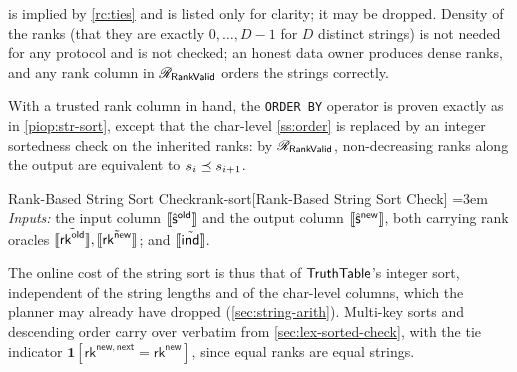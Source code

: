  is implied by \cref{rc:ties} and is listed only for clarity; it may be dropped. Density of the ranks (that they are exactly $0, \dots, D-1$ for $D$ distinct strings) is not needed for any protocol and is not checked; an honest data owner produces dense ranks, and any rank column in $\mathscr{R}_{\mathsf{RankValid}}$ orders the strings correctly.

With a trusted rank column in hand, the \texttt{ORDER BY} operator is proven exactly as in \cref{piop:str-sort}, except that the char-level \cref{ss:order} is replaced by an integer sortedness check on the inherited ranks: by $\mathscr{R}_{\mathsf{RankValid}}$, non-decreasing ranks along the output are equivalent to $s_i \preceq s_{i+1}$.

\begin{DefinePIOP}{Rank-Based String Sort Check}{rank-sort}[Rank-Based String Sort Check]
  \emergencystretch=3em\relax
  \emph{Inputs:} the input column $\llbracket\hat{\mathsf{s}}^{\mathsf{old}}\rrbracket$ and the output column $\llbracket\hat{\mathsf{s}}^{\mathsf{new}}\rrbracket$, both carrying rank oracles $\llbracket\tilde{\mathsf{rk}^{\mathsf{old}}}\rrbracket, \llbracket\tilde{\mathsf{rk}^{\mathsf{new}}}\rrbracket$; and $\llbracket\tilde{\mathsf{ind}}\rrbracket$.
  \vspace{2mm}
\end{DefinePIOP}

The online cost of the string sort is thus that of $\mathsf{TruthTable}$'s integer sort, independent of the string lengths and of the char-level columns, which the planner may already have dropped (\cref{sec:string-arith}). Multi-key sorts and descending order carry over verbatim from \cref{sec:lex-sorted-check}, with the tie indicator $\mathbf{1}[\mathsf{rk}^{\mathsf{new},\mathsf{next}} = \mathsf{rk}^{\mathsf{new}}]$, since equal ranks are equal strings.

